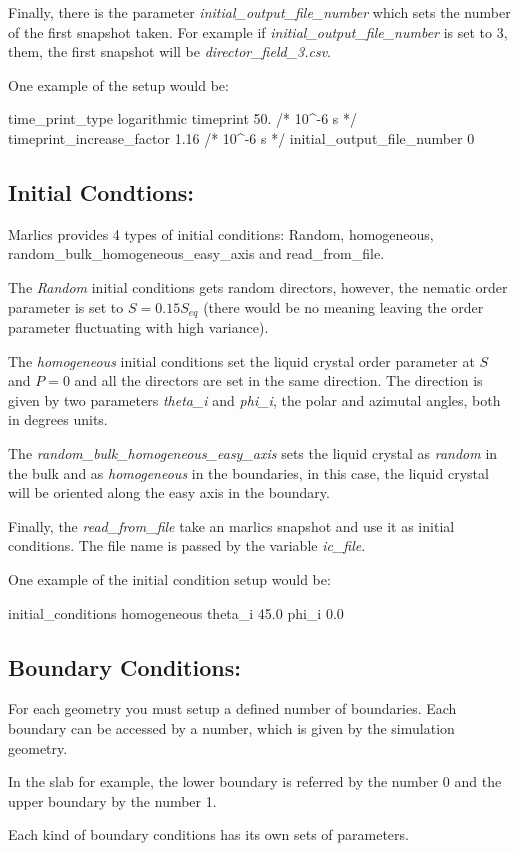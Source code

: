 \documentclass{article}
\begin{document}
Finally, there is the parameter \textit{initial_output_file_number} which sets the number of the first snapshot taken. For example if \textit{initial_output_file_number} is set to 3, them, the first snapshot will be \textit{director_field_3.csv}.

One example of the setup would be:

time_print_type	          logarithmic
timeprint                 50.        /*  10^-6 s   */
timeprint_increase_factor 1.16        /*  10^-6 s   */     
initial_output_file_number   0


\subsection{Initial Condtions:}

Marlics provides 4 types of initial conditions: Random, homogeneous, random_bulk_homogeneous_easy_axis and read_from_file.

The \textit{Random} initial conditions gets random directors, however, the nematic order parameter is set to $S=0.15 S_{eq}$ (there would be no meaning leaving the order parameter fluctuating with high variance).

The \textit{homogeneous} initial conditions set the liquid crystal order parameter at $S$ and $P=0$ and all the directors are set in the same direction. The direction is given by two parameters \textit{theta_i} and \textit{phi_i}, the polar and azimutal angles, both in degrees units.

The \textit{random_bulk_homogeneous_easy_axis} sets the liquid crystal as \textit{random} in the bulk and as \textit{homogeneous} in the boundaries, in this case, the liquid crystal will be oriented along the easy axis in the boundary.

Finally, the \textit{read_from_file} take an marlics snapshot and use it as initial conditions. The file name is passed by the variable \textit{ic_file}. 

One example of the initial condition setup would be:

initial_conditions homogeneous
theta_i 45.0
phi_i 0.0

\subsection{Boundary Conditions:}

For each geometry you must setup a defined number of boundaries. Each boundary can be accessed by a number, which is given  by the simulation geometry.



In the slab for example, the lower boundary is referred by the number 0 and the upper boundary by the number 1.


Each kind of boundary conditions has its own sets of parameters.
\end{document}
